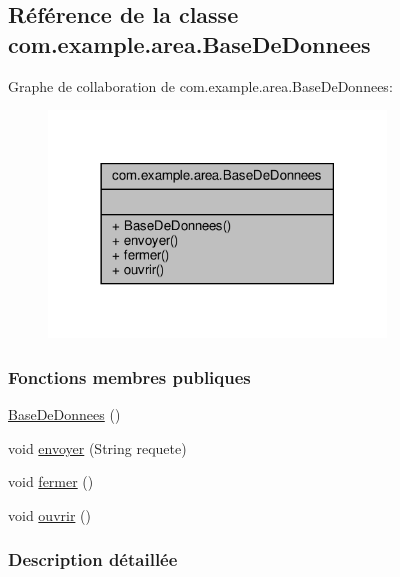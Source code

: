 \hypertarget{classcom_1_1example_1_1area_1_1_base_de_donnees}{}\subsection{Référence de la classe com.\+example.\+area.\+Base\+De\+Donnees}
\label{classcom_1_1example_1_1area_1_1_base_de_donnees}


Graphe de collaboration de com.\+example.\+area.\+Base\+De\+Donnees\+:
\nopagebreak
\begin{figure}[H]
\begin{center}
\leavevmode
\includegraphics[width=254pt]{classcom_1_1example_1_1area_1_1_base_de_donnees__coll__graph}
\end{center}
\end{figure}
\subsubsection*{Fonctions membres publiques}
\begin{DoxyCompactItemize}
\item 
\hyperlink{classcom_1_1example_1_1area_1_1_base_de_donnees_af9165ddf75f87c6f54c08159b5f791ce}{Base\+De\+Donnees} ()
\item 
void \hyperlink{classcom_1_1example_1_1area_1_1_base_de_donnees_adf1ed72483551ccae7812eec115b9bb7}{envoyer} (String requete)
\item 
void \hyperlink{classcom_1_1example_1_1area_1_1_base_de_donnees_ad51319bd8b62ebf33d33d6f3b8347d41}{fermer} ()
\item 
void \hyperlink{classcom_1_1example_1_1area_1_1_base_de_donnees_a71c0a57c6fe4a5097e4d4c7ef1585cf3}{ouvrir} ()
\end{DoxyCompactItemize}


\subsubsection{Description détaillée}


